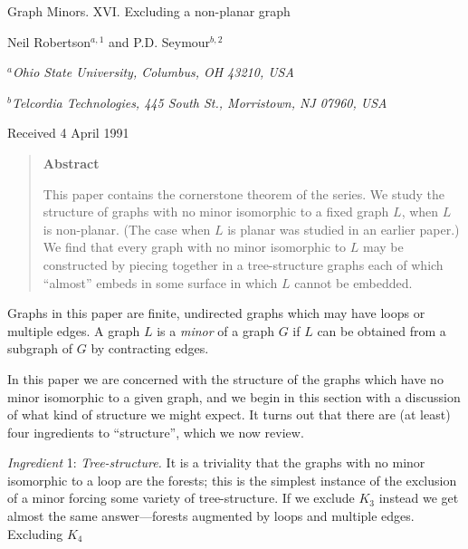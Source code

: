 {\centering
{\Large Graph Minors. XVI. Excluding a non-planar graph\par}\medskip

Neil Robertson$^{a,1}$ and P.D. Seymour$^{b,2}$\par
$^a$\textit{Ohio State University, Columbus, OH 43210, USA}\par
$^b$\textit{Telcordia Technologies, 445 South St., Morristown, NJ 07960, USA}\par
Received 4 April 1991\par
}
\begin{quote}
\textbf{Abstract}

This paper contains the cornerstone theorem of the series. We study the structure of graphs with no minor isomorphic to a fixed graph $L$, when $L$ is non-planar. (The case when $L$ is planar was studied in an earlier paper.) We find that every graph with no minor isomorphic to $L$ may be constructed by piecing together in a tree-structure graphs each of which ``almost'' embeds in some surface in which $L$ cannot be embedded.
\end{quote}


Graphs in this paper are finite, undirected graphs which may have loops or multiple edges. A graph $L$ is a \textit{minor} of a graph $G$ if $L$ can be obtained from a subgraph of $G$ by contracting edges.

In this paper we are concerned with the structure of the graphs which have no minor isomorphic to a given graph, and we begin in this section with a discussion of what kind of structure we might expect. It turns out that there are (at least) four ingredients to ``structure'', which we now review.

\textit{Ingredient} 1: \textit{Tree-structure.} It is a triviality that the graphs with no minor isomorphic to a loop are the forests; this is the simplest instance of the exclusion of a minor forcing some variety of tree-structure. If we exclude $K_3$ instead we get almost the same answer---forests augmented by loops and multiple edges. Excluding $K_4$%
%
